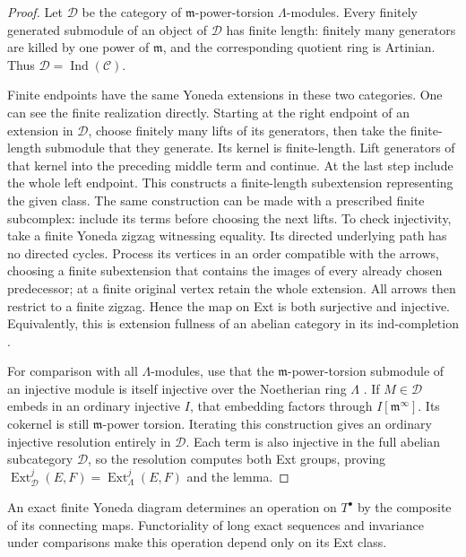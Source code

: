 \begin{proof}
Let $\mathcal D$ be the category of $\mathfrak m$-power-torsion
$\Lambda$-modules.  Every finitely generated submodule of an object
of $\mathcal D$ has finite length: finitely many generators are
killed by one power of $\mathfrak m$, and the corresponding
quotient ring is Artinian.  Thus
$\mathcal D=\operatorname{Ind}(\mathcal C)$.

Finite endpoints have the same Yoneda extensions in these two
categories.  One can see the finite realization directly.  Starting
at the right endpoint of an extension in $\mathcal D$, choose
finitely many lifts of its generators, then take the finite-length
submodule that they generate.  Its kernel is finite-length.  Lift
generators of that kernel into the preceding middle term and
continue.  At the last step include the whole left endpoint.
This constructs a finite-length subextension representing the
given class.  The same construction can be made with a prescribed
finite subcomplex: include its terms before choosing the next
lifts.  To check injectivity, take a finite Yoneda zigzag witnessing
equality.  Its directed underlying path has no directed cycles.
Process its vertices in an order compatible with the arrows,
choosing a finite subextension that contains the images of every
already chosen predecessor; at a finite original vertex retain the
whole extension.  All arrows then restrict to a finite zigzag.
Hence the map on Ext is both surjective and injective.
Equivalently, this is extension fullness of an abelian
category in its ind-completion
\cite[Theorem 2.2.1]{coulembier2020}.

For comparison with all $\Lambda$-modules, use that the
$\mathfrak m$-power-torsion submodule of an injective module is
itself injective over the Noetherian ring $\Lambda$
\cite[Lemma 47.3.9(2), Tag 08XW]{stacks}.
If $M\in\mathcal D$ embeds in an ordinary injective $I$, that
embedding factors through $I[\mathfrak m^\infty]$.  Its cokernel
is still $\mathfrak m$-power torsion.  Iterating this construction
gives an ordinary injective resolution entirely in $\mathcal D$.
Each term is also injective in the full abelian subcategory
$\mathcal D$, so the resolution computes both Ext groups, proving
$\operatorname{Ext}_{\mathcal D}^j(E,F)
=\operatorname{Ext}_\Lambda^j(E,F)$ and the lemma.
\end{proof}

An exact finite Yoneda diagram determines an operation on $T^\bullet$
by the composite of its connecting maps.  Functoriality of long exact
sequences and invariance under comparisons make this operation depend
only on its Ext class.

